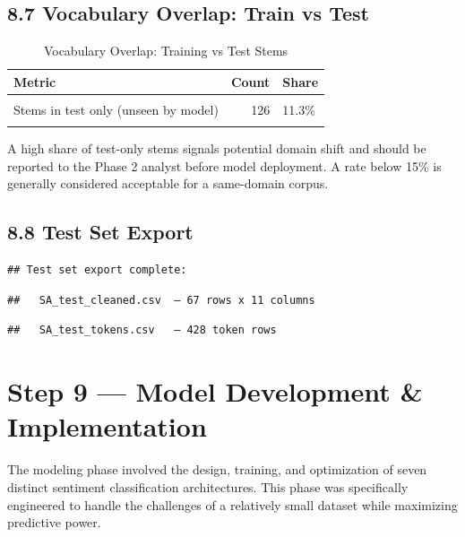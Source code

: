 \documentclass[
]{article}
\begin{document}
\subsection{8.7 Vocabulary Overlap: Train vs
Test}\label{vocabulary-overlap-train-vs-test}

\begin{longtable}[t]{lrl}
\caption{\label{tab:vocab-overlap}Vocabulary Overlap: Training vs Test Stems}\\
\toprule
Metric & Count & Share\\
\midrule
\cellcolor{gray!10}{Stems in both train \& test} & \cellcolor{gray!10}{152} & \cellcolor{gray!10}{13.7\%}\\
Stems in test only (unseen by model) & 126 & 11.3\%\\
\cellcolor{gray!10}{Stems in train only (absent from test)} & \cellcolor{gray!10}{835} & \cellcolor{gray!10}{75\%}\\
\bottomrule
\end{longtable}

A high share of test-only stems signals potential domain shift and
should be reported to the Phase 2 analyst before model deployment. A
rate below 15\% is generally considered acceptable for a same-domain
corpus.

\subsection{8.8 Test Set Export}\label{test-set-export}

\begin{verbatim}
## Test set export complete:
\end{verbatim}

\begin{verbatim}
##   SA_test_cleaned.csv  — 67 rows x 11 columns
\end{verbatim}

\begin{verbatim}
##   SA_test_tokens.csv   — 428 token rows
\end{verbatim}

\section{Step 9 --- Model Development \&
Implementation}\label{step-9-model-development-implementation}

The modeling phase involved the design, training, and optimization of
seven distinct sentiment classification architectures. This phase was
specifically engineered to handle the challenges of a relatively small
dataset while maximizing predictive power.
\end{document}
